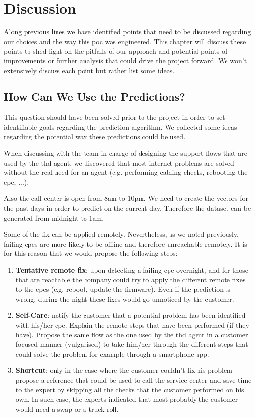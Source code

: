\chapter{Discussion}
\label{chap:discussion}
Along previous lines we have identified points that need to be discussed regarding our choices and the way this \acrshort{poc} was engineered. This chapter will discuss these points to shed light on the pitfalls of our approach and potential points of improvements or further analysis that could drive the project forward. We won't extensively discuss each point but rather list some ideas.

\section{How Can We Use the Predictions?}
This question should have been solved prior to the project in order to set identifiable goals regarding the prediction algorithm. We collected some ideas regarding the potential way these predictions could be used.

When discussing with the team in charge of designing the support flows that are used by the \acrshort{thd} agent, we discovered that most internet problems are solved without the real need for an agent (e.g. performing cabling checks, rebooting the \acrshort{cpe}, ...). 

Also the call center is open from 8am to 10pm. We need to create the vectors for the past days in order to predict on the current day. Therefore the dataset can be generated from midnight to 1am. 

Some of the fix can be applied remotely. Nevertheless, as we noted previously, failing \acrshort{cpe}s are more likely to be offline and therefore unreachable remotely. It is for this reason that we would propose the following steps:
\begin{enumerate}
	\item \textbf{Tentative remote fix}: upon detecting a failing \acrshort{cpe} overnight, and for those that are reachable the company could try to apply the different remote fixes to the \acrshort{cpe}s (e.g. reboot, update the firmware). Even if the prediction is wrong, during the night these fixes would go unnoticed by the customer. 
	\item \textbf{Self-Care}: notify the customer that a potential problem has been identified with his/her \acrshort{cpe}. Explain the remote steps that have been performed (if they have). Propose the same flow as the one used by the \acrshort{thd} agent in a customer focused manner (vulgarised) to take him/her through the different steps that could solve the problem for example through a smartphone app. 
	\item \textbf{Shortcut}: only in the case where the customer couldn't fix his problem propose a reference that could be used to call the service center and save time to the expert by skipping all the checks that the customer performed on his own. In such case, the experts indicated that most probably the customer would need a swap or a truck roll.
\end{enumerate}

